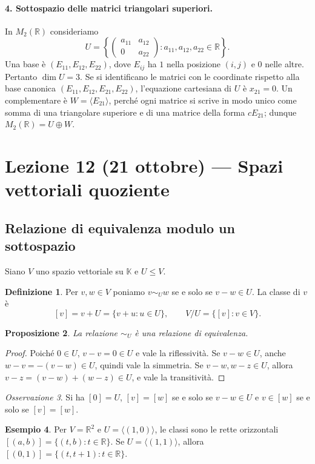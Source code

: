 \documentclass[11pt,a4paper]{article}
\newcommand{\RR}{\mathbb{R}}
\newcommand{\KK}{\mathbb{K}}
\theoremstyle{plain}
\newtheorem{prop}{Proposizione}[section]
\theoremstyle{definition}
\newtheorem{defn}[prop]{Definizione}
\newtheorem{esempio}[prop]{Esempio}
\theoremstyle{remark}
\newtheorem{oss}[prop]{Osservazione}
\begin{document}
\paragraph{4. Sottospazio delle matrici triangolari superiori.}
In $M_2(\RR)$ consideriamo
\[
 U=\left\{\begin{pmatrix}a_{11}&a_{12}\\0&a_{22}\end{pmatrix}:a_{11},a_{12},a_{22}\in\RR\right\}.
\]
Una base è $(E_{11},E_{12},E_{22})$, dove $E_{ij}$ ha $1$ nella posizione $(i,j)$ e $0$ nelle altre. Pertanto $\dim U=3$. Se si identificano le matrici con le coordinate rispetto alla base canonica $(E_{11},E_{12},E_{21},E_{22})$, l'equazione cartesiana di $U$ è $x_{21}=0$. Un complementare è $W=\langle E_{21}\rangle$, perché ogni matrice si scrive in modo unico come somma di una triangolare superiore e di una matrice della forma $cE_{21}$; dunque $M_2(\RR)=U\oplus W$.

\section{Lezione 12 (21 ottobre) --- Spazi vettoriali quoziente}
\subsection{Relazione di equivalenza modulo un sottospazio}
Siano $V$ uno spazio vettoriale su $\KK$ e $U\leq V$.
\begin{defn}
Per $v,w\in V$ poniamo $v\sim_U w$ se e solo se $v-w\in U$. La classe di $v$ è
\[
[v]=v+U=\{v+u:u\in U\},\qquad V/U=\{[v]:v\in V\}.
\]
\end{defn}
\begin{prop}
La relazione $\sim_U$ è una relazione di equivalenza.
\end{prop}
\begin{proof}
Poiché $0\in U$, $v-v=0\in U$ e vale la riflessività. Se $v-w\in U$, anche $w-v=-(v-w)\in U$, quindi vale la simmetria. Se $v-w,w-z\in U$, allora $v-z=(v-w)+(w-z)\in U$, e vale la transitività.
\end{proof}
\begin{oss}
Si ha $[0]=U$, $[v]=[w]$ se e solo se $v-w\in U$ e $v\in[w]$ se e solo se $[v]=[w]$.
\end{oss}
\begin{esempio}
Per $V=\RR^2$ e $U=\langle(1,0)\rangle$, le classi sono le rette orizzontali $[(a,b)]=\{(t,b):t\in\RR\}$. Se $U=\langle(1,1)\rangle$, allora $[(0,1)]=\{(t,t+1):t\in\RR\}$.
\end{esempio}
\end{document}
